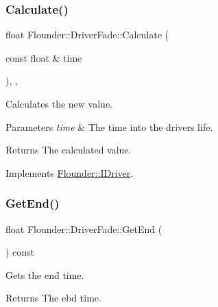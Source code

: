 \subsubsection{\texorpdfstring{Calculate()}{Calculate()}}
{\footnotesize\ttfamily float Flounder\+::\+Driver\+Fade\+::\+Calculate (\begin{DoxyParamCaption}\item[{const float \&}]{time }\end{DoxyParamCaption})\hspace{0.3cm}{\ttfamily [override]}, {\ttfamily [protected]}, {\ttfamily [virtual]}}



Calculates the new value. 


\begin{DoxyParams}{Parameters}
{\em time} & The time into the drivers life. \\
\hline
\end{DoxyParams}
\begin{DoxyReturn}{Returns}
The calculated value. 
\end{DoxyReturn}


Implements \hyperlink{class_flounder_1_1_i_driver_a969f0c8da089f9d17129ee12b40c354a}{Flounder\+::\+I\+Driver}.

\mbox{\label{class_flounder_1_1_driver_fade_aff927a9896a8ac1a96a7000b99668082}} 
\subsubsection{\texorpdfstring{Get\+End()}{GetEnd()}}
{\footnotesize\ttfamily float Flounder\+::\+Driver\+Fade\+::\+Get\+End (\begin{DoxyParamCaption}{ }\end{DoxyParamCaption}) const\hspace{0.3cm}{\ttfamily [inline]}}



Gets the end time. 

\begin{DoxyReturn}{Returns}
The ebd time. 
\end{DoxyReturn}
\mbox{\label{class_flounder_1_1_driver_fade_afb8148672da9d2fbf3d1fd5624af06fe}} 
